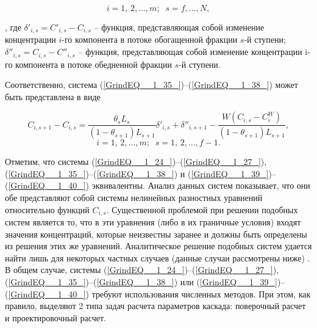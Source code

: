 \[i=1,\, 2,...,m;\; \; s=f,...,N,\] 

, где $\delta '_{i,s} =C'_{i,s} -C_{i,s} $ -- функция, представляющая собой изменение концентрации $i$-го компонента в потоке обогащенной фракции $s$-й ступени; $\delta ''_{i,s} =C_{i,s} -C''_{i,s} $ – функция, представляющая собой изменение концентрации i-го компонента в потоке обедненной фракции $s$-й ступени.

Соответственно, система (\ref{GrindEQ__1_35_})--(\ref{GrindEQ__1_38_}) может быть представлена в виде

\begin{equation} \label{GrindEQ__1_40_} 
  C_{i,s+1} -C_{i,s} =\frac{\theta _{s} L_{s} }{(1-\theta _{s+1} )L_{s+1} } \delta '_{i,s} +\delta ''_{i,s+1} -\frac{W(C_{i,s} -C_{i}^{W} )}{(1-\theta _{s+1} )L_{s+1} } ,        
  \end{equation} 
  \[i=1,\, 2,...,m;\; \; s=1,\, 2,...,f-1.\] 

Отметим, что системы (\ref{GrindEQ__1_24_})--(\ref{GrindEQ__1_27_}), (\ref{GrindEQ__1_35_})--(\ref{GrindEQ__1_38_}) и (\ref{GrindEQ__1_39_})--(\ref{GrindEQ__1_40_}) эквивалентны. Анализ данных систем показывает, что они обе представляют собой системы нелинейных разностных уравнений относительно функций $C_{i,s}$. Существенной проблемой при решении подобных систем является то, что в эти уравнения (либо в их граничные условия) входят значения концентраций, которые неизвестны заранее и должны быть определены из решения этих же уравнений. Аналитическое решение подобных систем удается найти лишь для некоторых частных случаев (данные случаи рассмотрены ниже) \cite{sulaberidzeTeoriyaKaskadovDlya2011}. В общем случае, системы (\ref{GrindEQ__1_24_})--(\ref{GrindEQ__1_27_}), (\ref{GrindEQ__1_35_})--(\ref{GrindEQ__1_38_}) или (\ref{GrindEQ__1_39_})--(\ref{GrindEQ__1_40_}) требуют использования численных методов. При этом, как правило, выделяют 2 типа задач расчета параметров каскада: поверочный расчет и проектировочный расчет.

